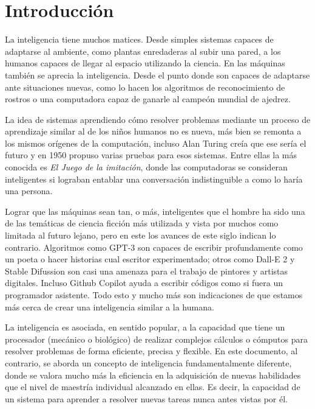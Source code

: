\chapter*{Introducción}\label{chapter:introduction}
La inteligencia tiene muchos matices. Desde simples sistemas capaces de adaptarse al ambiente, como plantas enredaderas al subir una pared, a los humanos capaces de llegar al espacio utilizando la ciencia. En las máquinas también se aprecia la inteligencia. Desde el punto donde son capaces de adaptarse ante situaciones nuevas, como lo hacen los algoritmos de reconocimiento de rostros o una computadora capaz de ganarle al campeón mundial de ajedrez. 

La idea de sistemas aprendiendo cómo resolver problemas mediante un proceso de aprendizaje similar al de los niños humanos no es nueva, más bien se remonta a los mismos orígenes de la computación, incluso Alan Turing creía que ese sería el futuro y en 1950 propuso varias pruebas para esos sistemas. Entre ellas la más conocida es \textit{El Juego de la imitación}, donde las computadoras se consideran inteligentes si lograban entablar una conversación indistinguible a como lo haría una persona.

Lograr que las máquinas sean tan, o más, inteligentes que el hombre ha sido una de las temáticas de ciencia ficción más utilizada y vista por muchos como limitada al futuro lejano, pero en este los avances de este siglo indican lo contrario. Algoritmos como GPT-3 son capaces de escribir profundamente como un poeta o hacer historias cual escritor experimentado; otros como Dall-E 2 y Stable Difussion son casi una amenaza para el trabajo de pintores y artistas digitales. Incluso Github Copilot ayuda a escribir códigos como si fuera un programador asistente. Todo esto y mucho más son indicaciones de que estamos más cerca de crear una inteligencia similar a la humana.

La inteligencia es asociada, en sentido popular, a la capacidad que tiene un procesador (mecánico o biológico) de realizar complejos cálculos o cómputos para resolver problemas de forma eficiente, precisa y flexible. En este documento, al contrario, se aborda un concepto de inteligencia fundamentalmente diferente, donde se valora mucho más la eficiencia en la adquisición de nuevas habilidades que el nivel de maestría individual alcanzado en ellas. Es decir, la capacidad de un sistema para aprender a resolver nuevas tareas nunca antes vistas por él.

